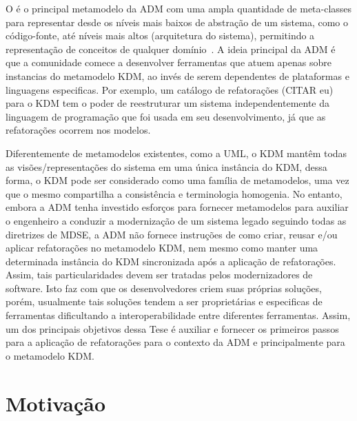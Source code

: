 O  é o principal metamodelo da ADM com uma ampla quantidade de meta-classes para representar desde os níveis mais baixos de abstração de um sistema, como o código-fonte, até níveis mais altos (arquitetura do sistema), permitindo a representação de conceitos de qualquer domínio~\cite{KDM:specification,KDM:ISO}. A ideia principal da ADM é que a comunidade comece a desenvolver ferramentas que atuem apenas sobre instancias do metamodelo KDM, ao invés de serem dependentes de plataformas e linguagens especificas. Por exemplo, um catálogo de refatorações (CITAR eu) para o KDM tem o poder de reestruturar um sistema independentemente da linguagem de programação que foi usada em seu desenvolvimento, já que as refatorações ocorrem nos modelos.

Diferentemente de metamodelos existentes, como a UML, o KDM mantêm todas as visões/representações do sistema em uma única instância do KDM, dessa forma, o KDM pode ser considerado como uma família de metamodelos, uma vez que o mesmo compartilha a consistência e terminologia homogenia. No entanto, embora a ADM tenha investido esforços para fornecer metamodelos para auxiliar o engenheiro a conduzir a modernização de um sistema legado seguindo todas as diretrizes de MDSE, a ADM não fornece instruções de como criar, reusar e/ou aplicar refatorações no metamodelo KDM, nem mesmo como manter uma determinada instância do KDM sincronizada após a aplicação de refatorações. Assim, tais particularidades devem ser tratadas pelos modernizadores de software. Isto faz com que os desenvolvedores criem suas próprias soluções, porém, usualmente tais soluções tendem a ser proprietárias e especificas de ferramentas dificultando a interoperabilidade entre diferentes ferramentas. Assim, um dos principais objetivos dessa Tese é auxiliar e fornecer os primeiros passos para a aplicação de refatorações para o contexto da ADM e principalmente para o metamodelo KDM.



\section{Motivação}\label{sec:justificativa_e_motivacao}


